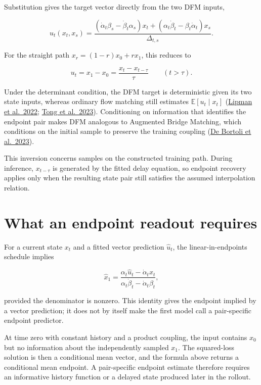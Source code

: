 \documentclass[11pt]{article}
\begin{document}
Substitution gives the target vector directly from the two DFM inputs,

\[
u_t(x_t,x_s)=
\frac{(\dot\alpha_t\beta_s-\dot\beta_t\alpha_s)x_t
+(\alpha_t\dot\beta_t-\beta_t\dot\alpha_t)x_s}
{\Delta_{t,s}}.
\]

For the straight path \(x_r=(1-r)x_0+rx_1\), this reduces to

\[
u_t=x_1-x_0=\frac{x_t-x_{t-\tau}}{\tau}
\qquad (t>\tau).
\]

Under the determinant condition, the DFM target is deterministic given its two state inputs, whereas ordinary flow matching still estimates \(\mathbb E[u_t\mid x_t]\) (\href{https://arxiv.org/abs/2210.02747}{Lipman et al.~2022}; \href{https://arxiv.org/abs/2302.00482}{Tong et al.~2023}). Conditioning on information that identifies the endpoint pair makes DFM analogous to Augmented Bridge Matching, which conditions on the initial sample to preserve the training coupling (\href{https://arxiv.org/abs/2311.06978}{De Bortoli et al.~2023}).

This inversion concerns samples on the constructed training path. During inference, \(x_{t-\tau}\) is generated by the fitted delay equation, so endpoint recovery applies only when the resulting state pair still satisfies the assumed interpolation relation.

\section{What an endpoint readout requires}\label{endpoint-readout}

For a current state \(x_t\) and a fitted vector prediction \(\widehat u_t\), the linear-in-endpoints schedule implies

\[
\widehat x_1=
\frac{\alpha_t\widehat u_t-\dot\alpha_tx_t}
{\alpha_t\dot\beta_t-\dot\alpha_t\beta_t},
\]

provided the denominator is nonzero. This identity gives the endpoint implied by a vector prediction; it does not by itself make the first model call a pair-specific endpoint predictor.

At time zero with constant history and a product coupling, the input contains \(x_0\) but no information about the independently sampled \(x_1\). The squared-loss solution is then a conditional mean vector, and the formula above returns a conditional mean endpoint. A pair-specific endpoint estimate therefore requires an informative history function or a delayed state produced later in the rollout.
\end{document}
